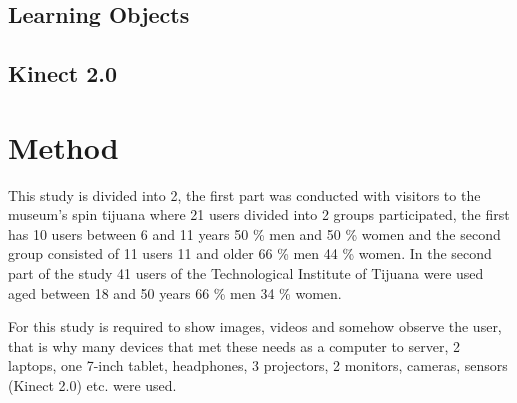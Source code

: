 \documentclass[journal]{IEEEtran}
\begin{document}
\subsection {Learning Objects}


\subsection {Kinect 2.0}

\section {Method}
\setlength{\parskip}{10pt}

This study is divided into 2, the first part was conducted with visitors to the museum's spin tijuana where 21 users divided into 2 groups participated, the first has 10 users between 6 and 11 years 50 \% men and 50 \% women and the second group consisted of 11 users 11 and older 66 \% men 44 \% women. In the second part of the study 41 users of the Technological Institute of Tijuana were used aged between 18 and 50 years 66 \% men 34 \% women.


For this study is required to show images, videos and somehow observe the user, that is why many devices that met these needs as a computer to server, 2 laptops, one 7-inch tablet, headphones, 3 projectors, 2 monitors, cameras, sensors (Kinect 2.0) etc. were used.
    
\end{document}
